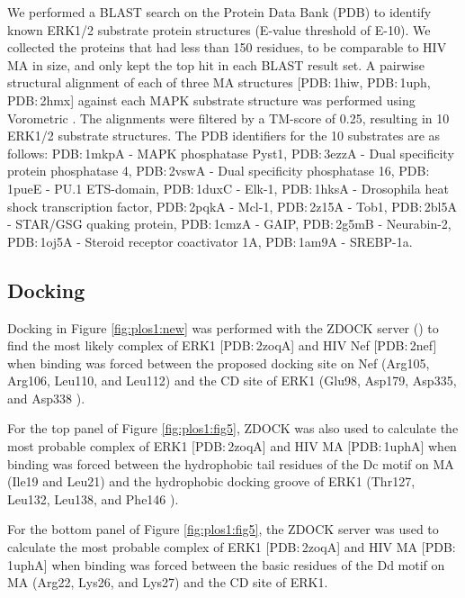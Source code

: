 We performed a BLAST \cite{altschul90} search on the Protein Data Bank
(PDB) \cite{berman02} to identify known ERK1/2 substrate protein
structures (E-value threshold of E-10). We collected the proteins that
had less than 150 residues, to be comparable to HIV MA in size, and
only kept the top hit in each BLAST result set. A pairwise structural
alignment of each of three MA structures [PDB$\colon$1hiw,
  PDB$\colon$1uph, PDB$\colon$2hmx] against each MAPK substrate
structure was performed using Vorometric \cite{sacan08}. The
alignments were filtered by a TM-score \cite{zhang04} of 0.25,
resulting in 10 ERK1/2 substrate structures. The PDB identifiers for
the 10 substrates are as follows: PDB$\colon$1mkpA - MAPK phosphatase
Pyst1, PDB$\colon$3ezzA - Dual specificity protein phosphatase 4,
PDB$\colon$2vswA - Dual specificity phosphatase 16, PDB$\colon$1pueE -
PU.1 ETS-domain, PDB$\colon$1duxC - Elk-1, PDB$\colon$1hksA -
Drosophila heat shock transcription factor, PDB$\colon$2pqkA - Mcl-1,
PDB$\colon$2z15A - Tob1, PDB$\colon$2bl5A - STAR/GSG quaking protein,
PDB$\colon$1cmzA - GAIP, PDB$\colon$2g5mB - Neurabin-2,
PDB$\colon$1oj5A - Steroid receptor coactivator 1A, PDB$\colon$1am9A -
SREBP-1a.

\subsection{Docking}

Docking in Figure \ref{fig:plos1:new} was performed with the ZDOCK
server ()
to find the most likely complex of ERK1 [PDB$\colon$2zoqA] and HIV Nef
[PDB$\colon$2nef] when binding was forced between the proposed docking
site on Nef (Arg105, Arg106, Leu110, and Leu112) and the CD site of
ERK1 (Glu98, Asp179, Asp335, and Asp338 \cite{kinoshita08}).

For the top panel of Figure \ref{fig:plos1:fig5}, ZDOCK was also used
to calculate the most probable complex of ERK1 [PDB$\colon$2zoqA] and
HIV MA [PDB$\colon$1uphA] when binding was forced between the
hydrophobic tail residues of the Dc motif on MA (Ile19 and Leu21) and
the hydrophobic docking groove of ERK1 (Thr127, Leu132, Leu138, and
Phe146 \cite{kinoshita08}).

For the bottom panel of Figure \ref{fig:plos1:fig5}, the ZDOCK
server was used to calculate the most probable complex of ERK1
[PDB$\colon$2zoqA] and HIV MA [PDB$\colon$1uphA] when binding was
forced between the basic residues of the Dd motif on MA (Arg22, Lys26,
and Lys27) and the CD site of ERK1.

